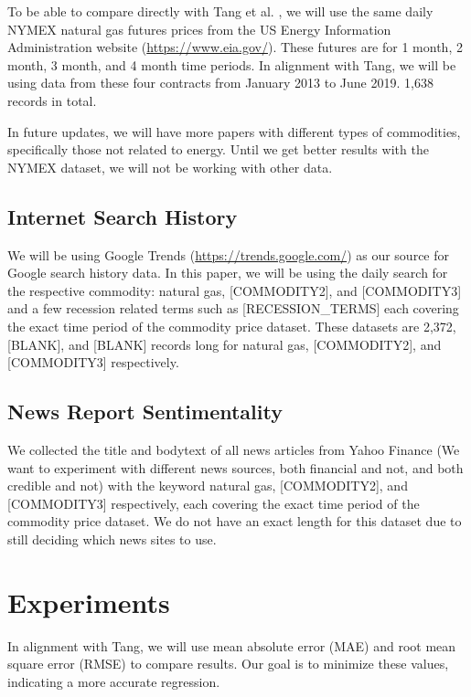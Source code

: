 \documentclass[final]{cvpr}
\begin{document}
    To be able to compare directly with Tang et al. \cite{tang}, we will use the
    same daily NYMEX natural gas futures prices from the US Energy Information
    Administration website (\url{https://www.eia.gov/}). These futures are for 1
    month, 2 month, 3 month, and 4 month time periods. In alignment with Tang,
    we will be using data from these four contracts from January 2013 to June
    2019. 1,638 records in total.

    In future updates, we will have more papers with different types of
    commodities, specifically those not related to energy. Until we get better
    results with the NYMEX dataset, we will not be working with other data.

\subsection{Internet Search History}

    We will be using Google Trends (\url{https://trends.google.com/}) as our source for Google search history data.
    In this paper, we will be using the daily search for the respective
    commodity: natural gas, [COMMODITY2], and [COMMODITY3] and a few recession
    related terms such as [RECESSION\_TERMS] each covering the exact time period
    of the commodity price dataset. These datasets are 2,372, [BLANK], and [BLANK]
    records long for natural gas, [COMMODITY2], and [COMMODITY3] respectively.

\subsection{News Report Sentimentality}

    We collected the title and bodytext of all news articles from Yahoo Finance
    (We want to experiment with different news sources, both financial and not,
    and both credible and not) with the keyword natural gas, [COMMODITY2], and 
    [COMMODITY3] respectively, each covering the exact time period of the
    commodity price dataset. We do not have an exact length for this dataset due
    to still deciding which news sites to use.

\section{Experiments}

    In alignment with Tang, we will use mean absolute error (MAE) and root mean
    square error (RMSE) to compare results. Our goal is to minimize these
    values, indicating a more accurate regression.
\end{document}
